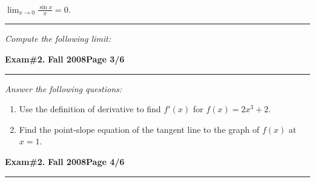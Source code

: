 \documentclass[12pt]{article}
\begin{document}
 $\displaystyle{\lim_{x\to 0} \frac{\sin x}{x}=0}.$
\vspace{14cm}
\hrule
{\problem[5 pts] \em Compute the following limit:}

\bigskip
{}
\newpage

\hfill{\large\bf Exam\#2.}\hfill{\large\bf
  Fall 2008}\hfill{\large\bf Page 3/6}\hrule

\bigskip
{\problem[10 pts] \em Answer the following questions:}
\begin{enumerate}
\item Use the definition of derivative to find $f'(x)$ for $f(x) = 2x^3+2$.
\vspace{10cm}
\begin{flushright}
\end{flushright}
\item Find the point-slope equation of the tangent line to the graph of $f(x)$ at $x=1$.
\end{enumerate}
\newpage

\hfill{\large\bf Exam\#2.}\hfill{\large\bf
  Fall 2008}\hfill{\large\bf Page 4/6}\hrule
\end{document}
